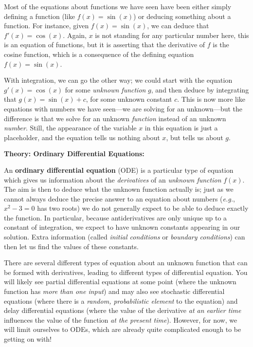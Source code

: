 \documentclass{article}
\begin{document}
Most of the equations about functions we have seen have been either simply defining a function (like $f(x)=\sin(x)$) or deducing something about a function. For instance, given $f(x)=\sin(x)$, we can deduce that $f'(x)=\cos(x)$. Again, $x$ is not standing for any particular number here, this is an equation of functions, but it is asserting that the derivative of $f$ is the cosine function, which is a consequence of the defining equation $f(x)=\sin(x)$.

With integration, we can go the other way; we could start with the equation $g'(x)=\cos(x)$ for some \textit{unknown function} $g$, and then deduce by integrating that $g(x)=\sin(x)+c$, for some unknown constant $c$. This is now more like equations with numbers we have seen---we are solving for an unknown---but the difference is that we solve for an unknown \textit{function} instead of an unknown \textit{number}. Still, the appearance of the variable $x$ in this equation is just a placeholder, and the equation tells us nothing about $x$, but tells us about $g$.












\clearpage





\textbf{Theory: Ordinary Differential Equations:}\bigskip


An \textbf{ordinary differential equation} (ODE) is a particular type of equation which gives us information about the \textit{derivatives} of an \textit{unknown function} $f(x)$. The aim is then to deduce what the unknown function actually is; just as we cannot always deduce the precise answer to an equation about numbers (\textit{e.g.}, $x^2-3=0$ has two roots) we do not generally expect to be able to deduce exactly the function. In particular, because antiderivatives are only unique up to a constant of integration, we expect to have unknown constants appearing in our solution. Extra information (called \textit{initial conditions} or \textit{boundary conditions}) can then let us find the values of these constants.

There are several different types of equation about an unknown function that can be formed with derivatives, leading to different types of differential equation. You will likely see partial differential equations at some point (where the unknown function has \textit{more than one input}) and may also see stochastic differential equations (where there is a \textit{random, probabilistic element} to the equation) and delay differential equations (where the value of the derivative \textit{at an earlier time} influences the value of the function \textit{at the present time}). However, for now, we will limit ourselves to ODEs, which are already quite complicated enough to be getting on with!
\end{document}
